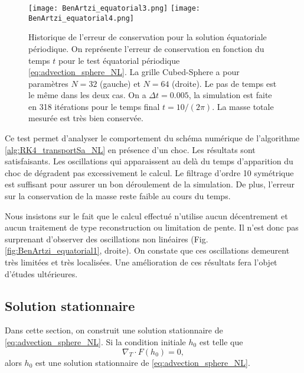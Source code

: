 \begin{figure}[htbp]
\begin{center}
\texttt{[image: BenArtzi\_equatorial3.png]}
\texttt{[image: BenArtzi\_equatorial4.png]}
\end{center}
\caption{Historique de l'erreur de conservation pour la solution équatoriale périodique. On représente l'erreur de conservation en fonction du temps $t$ pour le test équatorial périodique \eqref{eq:advection_sphere_NL}. La grille Cubed-Sphere a pour paramètres $N=32$ (gauche) et $N=64$ (droite). Le pas de temps est le même dans les deux cas. On a $\Delta t = 0.005$, la simulation est faite en 318 itérations pour le temps final $t=10/(2\pi)$. La masse totale mesurée est très bien conservée.}
\label{fig:BenArtzi_equatorial3}
\end{figure} 

Ce test permet d'analyser le comportement du schéma numérique de l'algorithme \ref{alg:RK4_transportSa_NL} en présence d'un choc. Les résultats sont satisfaisants. Les oscillations qui apparaissent au delà du temps d'apparition du choc de dégradent pas excessivement le calcul. Le filtrage d'ordre 10 symétrique est suffisant pour assurer un bon déroulement de la simulation. De plus, l'erreur sur la conservation de la masse reste faible au cours du temps.

Nous insistons sur le fait que le calcul effectué n'utilise aucun décentrement et aucun traitement de type reconstruction ou limitation de pente. Il n'est donc pas surprenant d'observer des oscillations non linéaires (Fig. \ref{fig:BenArtzi_equatorial1}, droite). On constate que ces oscillations demeurent très limitées et très localisées. Une amélioration de ces résultats fera l'objet d'études ultérieures.





















\subsection{Solution stationnaire}

Dans cette section, on construit une solution stationnaire de \eqref{eq:advection_sphere_NL}. Si la condition initiale $h_0$ est telle que
\begin{equation}
\nabla_T \cdot F(h_0) = 0,
\end{equation}
alors $h_0$ est une solution stationnaire de \eqref{eq:advection_sphere_NL}.

